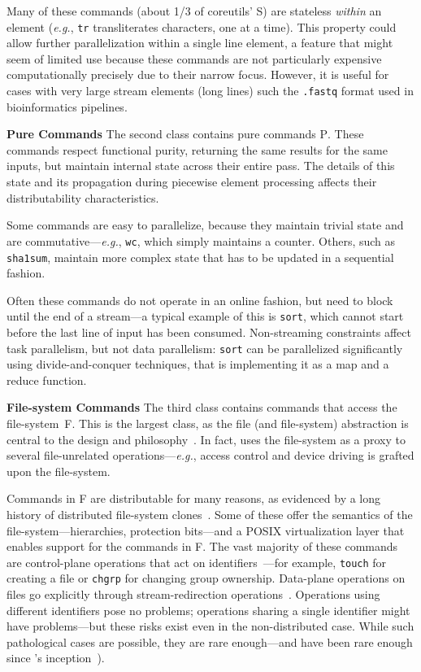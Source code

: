 \documentclass[sigplan,10pt,review,anonymous]{acmart}
\newcommand{\eg}{{\em e.g.}, }
\newcommand{\heading}[1]{\vspace{4pt}\noindent\textbf{#1}\enspace}
\newcommand{\ttt}[1]{\texttt{\small #1}}
\newcommand{\cn}[1]{\mbox{\textcircled{\footnotesize #1}}}
\newcommand{\pur}{\cn{\textsc{P}}\xspace}
\newcommand{\sta}{\cn{\textsc{S}}\xspace}
\newcommand{\dfs}{\cn{\textsc{F}}\xspace}
\begin{document}
Many of these commands (about 1/3 of coreutils' \sta) are stateless \emph{within} an element (\eg \ttt{tr} transliterates characters, one at a time).
This property could allow further parallelization within a single line element, a feature that might seem of limited use because these commands are not particularly expensive computationally precisely due to their narrow focus.
However, it is useful for cases with very large stream elements (long lines) such the \ttt{.fastq} format used in bioinformatics pipelines.

\heading{Pure Commands}
The second class contains pure commands \pur.
These commands respect functional purity, returning the same results for the same inputs, but maintain internal state across their entire pass.
The details of this state and its propagation during piecewise element processing affects their distributability characteristics.

Some commands are easy to parallelize, because they maintain trivial state and are commutative---\eg \ttt{wc}, which simply maintains a counter.
Others, such as \ttt{sha1sum}, maintain more complex state that has to be updated in a sequential fashion.

Often these commands do not operate in an online fashion, but need to block until the end of a stream---a typical example of this is \ttt{sort}, which cannot start before the last line of input has been consumed.
Non-streaming constraints affect task parallelism, but not data parallelism:
  \ttt{sort} can be parallelized significantly using divide-and-conquer techniques, that is implementing it as a map and a reduce function.

\heading{File-system Commands}
The third class contains commands that access the file-system~\dfs.
This is the largest class, as the file (and file-system) abstraction is central to the \unix design and philosophy~\cite{unix}.
In fact, \unix uses the file-system as a proxy to several file-unrelated operations---\eg access control and device driving is grafted upon the file-system.

Commands in \dfs are distributable for many reasons, as evidenced by a long history of distributed \unix file-system clones~\cite{catalogue}.
Some of these offer the semantics of the \unix file-system---hierarchies, protection bits---and a POSIX virtualization layer that enables support for the commands in \dfs.
The vast majority of these commands are control-plane operations that act on identifiers~---for example, \ttt{touch} for creating a file or \ttt{chgrp} for changing group ownership.
Data-plane operations on files go explicitly through stream-redirection operations~.
Operations using different identifiers pose no problems;
  operations sharing a single identifier might have problems---but these risks exist even in the non-distributed case.
While such pathological cases are possible, they are rare enough---and have been rare enough since \unix's inception~\cite[\S3.6]{unix}).
\end{document}
